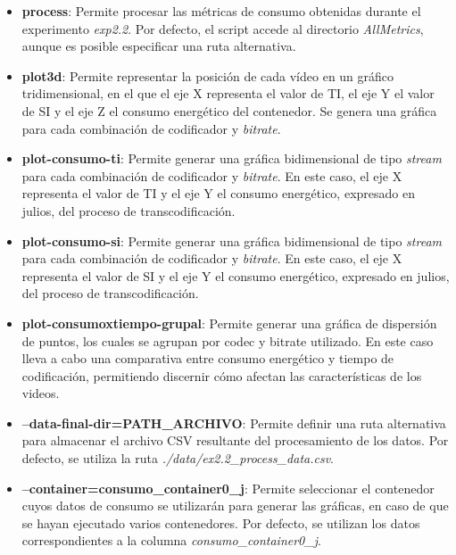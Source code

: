 \begin{itemize}
     \item \textbf{process}: Permite procesar las métricas de consumo obtenidas durante el experimento \textit{exp2.2}. Por defecto, el script accede al directorio \textit{AllMetrics}, aunque es posible especificar una ruta alternativa.

     \item \textbf{plot3d}: Permite representar la posición de cada vídeo en un gráfico tridimensional, en el que el eje X representa el valor de TI, el eje Y el valor de SI y el eje Z el consumo energético del contenedor. Se genera una gráfica para cada combinación de codificador y \textit{bitrate}.

     \item \textbf{plot-consumo-ti}: Permite generar una gráfica bidimensional de tipo \textit{stream} para cada combinación de codificador y \textit{bitrate}. En este caso, el eje X representa el valor de TI y el eje Y el consumo energético, expresado en julios, del proceso de transcodificación.

     \item \textbf{plot-consumo-si}: Permite generar una gráfica bidimensional de tipo \textit{stream} para cada combinación de codificador y \textit{bitrate}. En este caso, el eje X representa el valor de SI y el eje Y el consumo energético, expresado en julios, del proceso de transcodificación.
     
     \item \textbf{plot-consumoxtiempo-grupal}: Permite generar una gráfica de dispersión de puntos, los cuales se agrupan por codec y bitrate utilizado. En este caso lleva a cabo una comparativa entre consumo energético y tiempo de codificación, permitiendo discernir cómo afectan las características de los videos.

     \item \textbf{--data-final-dir=PATH\_ARCHIVO}: Permite definir una ruta alternativa para almacenar el archivo CSV resultante del procesamiento de los datos. Por defecto, se utiliza la ruta \textit{./data/ex2.2\_process\_data.csv}.

     \item \textbf{--container=consumo\_container0\_j}: Permite seleccionar el contenedor cuyos datos de consumo se utilizarán para generar las gráficas, en caso de que se hayan ejecutado varios contenedores. Por defecto, se utilizan los datos correspondientes a la columna \textit{consumo\_container0\_j}.

\end{itemize}

